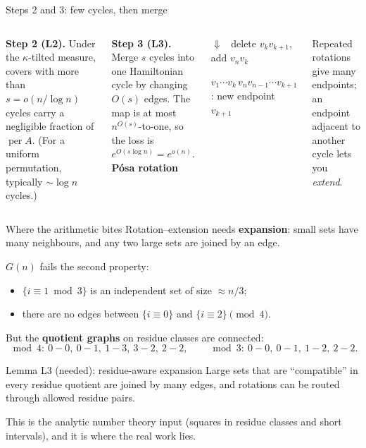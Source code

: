 \documentclass[11pt,aspectratio=169]{beamer}
\begin{document}
\begin{frame}{Steps 2 and 3: few cycles, then merge}
\begin{columns}
\textbf{Step 2 (L2).} Under the $\kappa$-tilted measure, covers with more than $s=o(n/\log n)$
cycles carry a negligible fraction of $\operatorname{per}A$. (For a uniform permutation,
typically $\sim\log n$ cycles.)

\medskip
\textbf{Step 3 (L3).} Merge $s$ cycles into one Hamiltonian cycle by changing $O(s)$
edges. The map is at most $n^{O(s)}$-to-one, so the loss is $e^{O(s\log n)}=e^{o(n)}$.
\textbf{Pósa rotation}
\begin{center}

\medskip
$\Downarrow$ \ delete $v_kv_{k+1}$, add $v_nv_k$

\medskip
{\small $v_1\cdots v_k\,v_n v_{n-1}\cdots v_{k+1}$: new endpoint $v_{k+1}$}
\end{center}
Repeated rotations give many endpoints; an endpoint adjacent to another cycle
lets you \emph{extend}.
\end{columns}
\end{frame}

\begin{frame}{Where the arithmetic bites}
Rotation--extension needs \textbf{expansion}: small sets have many neighbours, and
any two large sets are joined by an edge.

\medskip
$G(n)$ fails the second property:
\begin{itemize}
\item $\{i\equiv1 \bmod 3\}$ is an independent set of size $\approx n/3$;
\item there are no edges between $\{i\equiv0\}$ and $\{i\equiv2\} \pmod 4$.
\end{itemize}
\pause
But the \textbf{quotient graphs} on residue classes are connected:
\[
\bmod 4:\ 0\!-\!0,\ 0\!-\!1,\ 1\!-\!3,\ 3\!-\!2,\ 2\!-\!2,\qquad
\bmod 3:\ 0\!-\!0,\ 0\!-\!1,\ 1\!-\!2,\ 2\!-\!2 .
\]
\begin{block}{Lemma L3 (needed): residue-aware expansion}
Large sets that are ``compatible'' in every residue quotient are joined by many edges, and
rotations can be routed through allowed residue pairs.
\end{block}
This is the analytic number theory input (squares in residue classes and short
intervals), and it is where the real work lies.
\end{frame}
\end{document}

